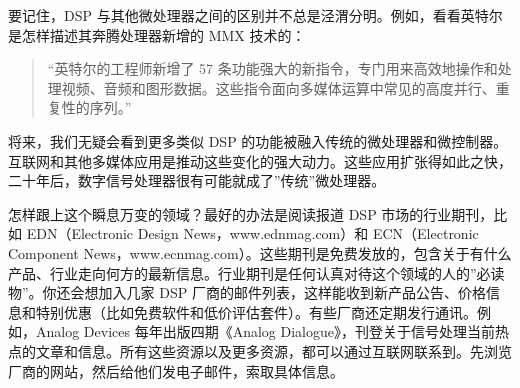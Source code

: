 要记住，DSP
与其他微处理器之间的区别并不总是泾渭分明。例如，看看英特尔是怎样描述其奔腾处理器新增的
MMX 技术的：

\begin{quote}
``英特尔的工程师新增了 57
条功能强大的新指令，专门用来高效地操作和处理视频、音频和图形数据。这些指令面向多媒体运算中常见的高度并行、重复性的序列。''
\end{quote}

将来，我们无疑会看到更多类似 DSP
的功能被融入传统的微处理器和微控制器。互联网和其他多媒体应用是推动这些变化的强大动力。这些应用扩张得如此之快，二十年后，数字信号处理器很有可能就成了''传统''微处理器。

怎样跟上这个瞬息万变的领域？最好的办法是阅读报道 DSP
市场的行业期刊，比如 EDN（Electronic Design News，www.ednmag.com）和
ECN（Electronic Component
News，www.ecnmag.com）。这些期刊是免费发放的，包含关于有什么产品、行业走向何方的最新信息。行业期刊是任何认真对待这个领域的人的''必读物''。你还会想加入几家
DSP
厂商的邮件列表，这样能收到新产品公告、价格信息和特别优惠（比如免费软件和低价评估套件）。有些厂商还定期发行通讯。例如，Analog
Devices 每年出版四期《Analog
Dialogue》，刊登关于信号处理当前热点的文章和信息。所有这些资源以及更多资源，都可以通过互联网联系到。先浏览厂商的网站，然后给他们发电子邮件，索取具体信息。
